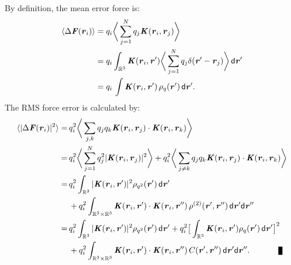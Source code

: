 \documentclass[aps,pre,preprint,unsortedaddress]{revtex4}
\renewcommand{\v}[1]{\textbf{\textit{#1}}}
\renewcommand{\d}[1]{\textsf{#1}}
\newenvironment{proof}[1][Proof]{\begin{trivlist}
\item[\hskip \labelsep {\bfseries #1}]}{\end{trivlist}}
\newcommand{\qed}{\nobreak \ifvmode \relax \else
      \ifdim\lastskip<1.5em \hskip-\lastskip
      \hskip1.5em plus0em minus0.5em \fi \nobreak
      \vrule height0.75em width0.5em depth0.25em\fi}
\begin{document}
\begin{proof}
  By definition, the mean error force is:
  \begin{align*}
    \langle\Delta\v F(\v r_i)\rangle
    &=
    q_i\bigg\langle \sum_{j=1}^Nq_j\v K(\v r_i,\v r_j)\bigg\rangle\\
    &=
    q_i\int_{\mathbb R^3}\v K(\v r_i, \v r')
    \bigg\langle \sum_{j=1}^Nq_j\delta (\v r' -\v r_j)\bigg\rangle
    \,\d d\v r'\\
    &= 
    q_i\,\int\v K(\v r_i,\v r')\,\rho_q(\v r')\,\d d\v r'.
  \end{align*}
  The RMS force error is calculated by:
  \begin{align} \nonumber
    \langle\vert\Delta\v F(\v r_i)\vert^2\rangle
    =\,&
    q_i^2\bigg\langle\sum_{j,k}
    q_jq_k\v K(\v r_i, \v r_j)\cdot\v K(\v r_i, \v r_k)\bigg\rangle \\ \nonumber
    =\,&
    q_i^2\bigg\langle\sum_{j=1}^N
    q_j^2\vert\v K(\v r_i, \v r_j)\vert^2
    \bigg\rangle +
    q_i^2\bigg\langle\sum_{j\neq k}
    q_jq_k \v K(\v r_i, \v r_j)\cdot\v K(\v r_i, \v r_k)
    \bigg\rangle \\ \nonumber
    =\,&
    q_i^2\int_{\mathbb R^3}
    \vert\v K(\v r_i, \v r')\vert^2\rho_{q^2}(\v r')\,\d d\v r'
    \\\label{eqn:prf-error-step3}
    & +
    q_i^2\int_{\mathbb R^3\times\mathbb R^3}
    \v K(\v r_i , \v r')\cdot\v K(\v r_i , \v r'')\,
    \rho^{(2)}(\v r', \v r'')
    \,\d d\v r'\d d\v r''\\\nonumber
    =\,&
    q_i^2\int_{\mathbb R^3}
    \vert\v K(\v r_i , \v r')\vert^2\rho_{q^2}(\v r')\,\d d\v r'
    +
    q_i^2
    \big[
    \int_{\mathbb R^3}
    \v K(\v r_i , \v r')\rho_{q}(\v r')\,\d d\v r'
    \big]^2
    \\ \nonumber
    & +
    q_i^2\int_{\mathbb R^3\times\mathbb R^3}
    \v K(\v r_i , \v r')\cdot\v K(\v r_i , \v r'')\,
    C(\v r', \v r'')
    \,\d d\v r'\d d\v r''.\qquad\qed
  \end{align}
\end{proof}
\end{document}
